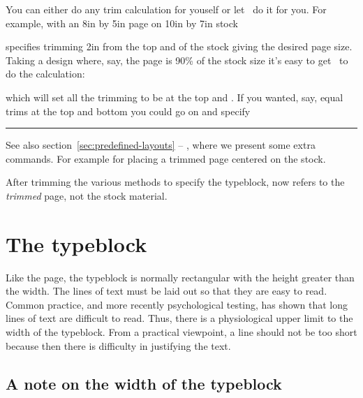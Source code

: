     You can either do any trim calculation for youself or let \ltx\ do it for
you. For example, with an 8in by 5in page on 10in by 7in stock
\begin{lcode}
\settrims{2in}{2in}
\end{lcode}
specifies trimming 2in from the top and \foredge{} of the stock
giving the desired page size. Taking a design where, say, the page 
is 90\% of the stock size it's easy to get \ltx\ to do the calculation:
\begin{lcode}
\setlength{\trimtop}{\stockheight}    %
\addtolength{\trimtop}{-\paperheight}  %
\setlength{\trimedge}{\stockwidth}    %
\addtolength{\trimedge}{-\paperwidth} %
\end{lcode}
which will set all the trimming to be at the top and \foredge. 
If you wanted, say, equal trims at the top and bottom you could go 
on and specify
\begin{lcode}
\settrims{0.5\trimtop}{\trimedge}
\end{lcode}

\fancybreak{}

See also section~\ref{sec:predefined-layouts} --
\emph{}, where we present some extra
commands. For example \cmd{\setpagecc} for placing a trimmed page
centered on the stock.

After trimming the various methods to specify the typeblock, now
refers to the \emph{trimmed} page, not the stock material.


\section{The typeblock} \label{sec:typeblock2}

    Like the page, the typeblock is normally 
rectangular with the height greater than the width.
The lines of text must be laid out so that they are easy to read.
Common practice, and more recently psychological testing, has shown that
long lines of text are difficult to read. Thus, there is a physiological
upper limit to the width of the typeblock. From a practical viewpoint,
a line should not be too short because then there is difficulty in justifying
the text.

\subsection{A note on the width of the typeblock}


